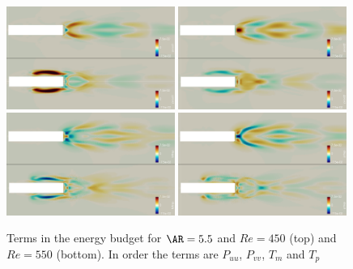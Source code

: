 \begin{figure}
  \centering
  \includegraphics[width=0.49\textwidth]{./fig/AR5p5/Prod1_Re450_Re550_beta2.png}
  \includegraphics[width=0.49\textwidth]{./fig/AR5p5/Prod2_Re450_Re550_beta2.png}  
  \includegraphics[width=0.49\textwidth]{./fig/AR5p5/Mtrsp_Re450_Re550_beta2.png}
  \includegraphics[width=0.49\textwidth]{./fig/AR5p5/Ptrsp_Re450_Re550_beta2.png}
  \caption{Terms in the energy budget for $\AR=5.5$ and $Re=450$ (top) and $Re=550$ (bottom). In order the terms are $P_{uu}$, $P_{vv}$, $T_{m}$ and $T_p$}
  \label{fig:ener_bud}
\end{figure}

